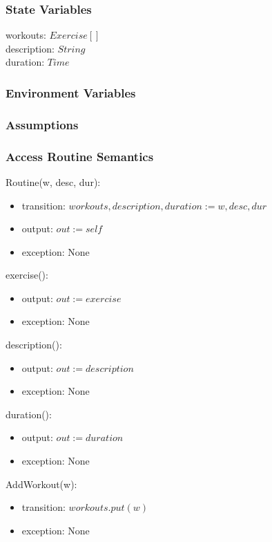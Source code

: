 \documentclass[12pt, titlepage]{article}
\begin{document}
\subsubsection{State Variables}
workouts: $Exercise[]$ \\
description: $String$ \\
duration: $Time$ \\

\subsubsection{Environment Variables}

\subsubsection{Assumptions}

\subsubsection{Access Routine Semantics}

Routine(w, desc, dur):
\begin{itemize}
	\item transition: $workouts, description, duration := w, desc, dur$
	\item output: $out := self$
	\item exception: None
\end{itemize}

exercise():
\begin{itemize}
	\item output: $out := exercise$
	\item exception: None
\end{itemize}

description():
\begin{itemize}
	\item output: $out := description$
	\item exception: None
\end{itemize}

duration():
\begin{itemize}
	\item output: $out := duration$
	\item exception: None
\end{itemize}

AddWorkout(w):
\begin{itemize}
	\item transition: $workouts.put(w)$
	\item exception: None
\end{itemize}
\end{document}
